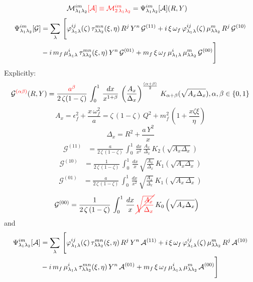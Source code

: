 \documentclass[9pt]{article}
\newcommand{\chg}[1]{{\color{red}#1}}
\newcommand{\del}[1]{{\color{red}\cancel{#1}}}
\numberwithin{equation}{section}
\begin{document}
\begin{align}
\mathcal{M}^{im}_{\lambda_{1}\lambda_{2}}\chg{[\mathcal{A}] \equiv \mathcal{M}^{im}_{2\,\lambda_{1}\lambda_{2}}} & = \Psi^{im}_{\lambda_{1}\lambda_{2}}[\mathcal{A}](R,Y)
\label{chg:M2}\end{align}
\begin{align}
  \Psi^{im}_{\lambda_{1}\lambda_{2}}[\mathcal{G}] & = \sum_{\lambda}\, \Bigg[\varphi^{ij}_{\lambda_{1}\lambda}(\zeta)\,\tau^{mn}_{\lambda\lambda_{2}}(\xi,\eta)\,R^{j}\,Y^{n}\,\mathcal{G}^{(11)}+i\,\xi\,\omega_{f}\,\varphi^{ij}_{\lambda_{1}\lambda}(\zeta)\,\mu^{m}_{\lambda\lambda_{2}}\,R^{j}\,\mathcal{G}^{(10)}\notag \\ & -i\,m_{f}\,\mu^{i}_{\lambda_{1}\lambda}\,\tau^{mn}_{\lambda\lambda_{2}}(\xi,\eta)\,Y^{n}\,\mathcal{G}^{(01)} + m_{f}\,\xi\,\omega_{f}\,\mu^{i}_{\lambda_{1}\lambda}\,\mu^{m}_{\lambda\lambda_{2}}\,\mathcal{G}^{(00)}\Bigg]  
\end{align}
Explicitly: 
\label{chg:abetab}$$\mathcal{G}^{\chg{(\alpha\beta)}}(R,Y) = \frac{\chg{a^{\beta}}}{2\,\zeta(1-\zeta)}\,\int_{0}^{1}\, \frac{dx}{x^{1+\beta}}\, \left(\frac{A_{x}}{\Delta_{x}}\right)^{\frac{(\alpha + \beta)}{2}}\,K_{\alpha + \beta} (\sqrt{A_{x}\Delta_{x}}), \alpha, \beta \in \{0,1\}$$
$$A_{x} = \epsilon^{2}_{f} + \frac{x\,\omega^{2}_{f}}{a} = \zeta\,(1-\zeta)\,Q^{2} +m^{2}_{f}\,\left(1+\frac{x\zeta\xi}{\eta}\right)$$
$$\Delta_{x} = R^{2} + \frac{a\,Y^{2}}{x}$$
\begin{align}
    \mathcal{G}^{(11)} & = \frac{a}{2\,\zeta\, (1-\zeta)}\, \int_{0}^{1}\, \frac{dx}{x^{2}}\, \frac{A_{x}}{\Delta_{x}}\,K_{2}\left(\sqrt{A_{x}\Delta_{x}}\right)
\end{align}
\begin{align}
    \mathcal{G}^{(10)} & = \frac{1}{2\, \zeta\, (1-\zeta)}\, \int_{0}^{1}\, \frac{dx}{x}\, \sqrt{\frac{A_{x}}{\Delta_{x}}}\, K_{1}\left(\sqrt{A_{x}\Delta_{x}}\right)
\end{align}
\begin{align}
     \mathcal{G}^{(01)} & = \frac{a}{2\, \zeta\, (1-\zeta)}\, \int_{0}^{1}\, \frac{dx}{x^{2}}\, \sqrt{\frac{A_{x}}{\Delta_{x}}}\, K_{1}\left(\sqrt{A_{x}\,\Delta_{x}}\right)
\end{align}
\begin{align}
     \mathcal{G}^{(00)} & = \frac{1}{2\, \zeta\, (1-\zeta)}\, \int_{0}^{1}\, \frac{dx}{x}\, \del{\sqrt{\frac{A_{x}}{\Delta_{x}}}}\, K_{0}\left(\sqrt{A_{x}\Delta_{x}}\right)
\label{chg:G00b}\end{align}
and
\begin{align}
  \Psi^{im}_{\lambda_{1}\lambda_{2}}[\mathcal{A}] & = \sum_{\lambda}\, \Bigg[\varphi^{ij}_{\lambda_{1}\lambda}(\zeta)\,\tau^{mn}_{\lambda\lambda_{2}}(\xi,\eta)\,R^{j}\,Y^{n}\,\mathcal{A}^{(11)}+i\,\xi\,\omega_{f}\,\varphi^{ij}_{\lambda_{1}\lambda}(\zeta)\,\mu^{m}_{\lambda\lambda_{2}}\,R^{j}\,\mathcal{A}^{(10)}\notag \\ & -i\,m_{f}\,\mu^{i}_{\lambda_{1}\lambda}\,\tau^{mn}_{\lambda\lambda_{2}}(\xi,\eta)\,Y^{n}\,\mathcal{A}^{(01)} + m_{f}\,\xi\,\omega_{f}\,\mu^{i}_{\lambda_{1}\lambda}\,\mu^{m}_{\lambda\lambda_{2}}\,\mathcal{A}^{(00)}\Bigg]  
\end{align}
\end{document}
